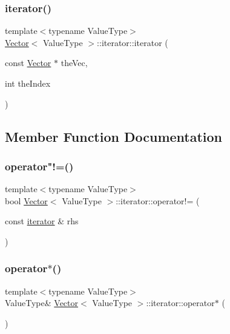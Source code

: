 \subsubsection{\texorpdfstring{iterator()}{iterator()}\hspace{0.1cm}{\footnotesize\ttfamily [3/3]}}
{\footnotesize\ttfamily template$<$typename Value\+Type$>$ \\
\mbox{\hyperlink{classVector}{Vector}}$<$ Value\+Type $>$\+::iterator\+::iterator (\begin{DoxyParamCaption}\item[{const \mbox{\hyperlink{classVector}{Vector}} $\ast$}]{the\+Vec,  }\item[{int}]{the\+Index }\end{DoxyParamCaption})\hspace{0.3cm}{\ttfamily [inline]}}



\subsection{Member Function Documentation}
\mbox{\label{classVector_1_1iterator_a1e7af33b9a9c2d4c9e4ec5ef35603299}} 
\subsubsection{\texorpdfstring{operator"!=()}{operator!=()}}
{\footnotesize\ttfamily template$<$typename Value\+Type$>$ \\
bool \mbox{\hyperlink{classVector}{Vector}}$<$ Value\+Type $>$\+::iterator\+::operator!= (\begin{DoxyParamCaption}\item[{const \mbox{\hyperlink{classVector_1_1iterator}{iterator}} \&}]{rhs }\end{DoxyParamCaption})\hspace{0.3cm}{\ttfamily [inline]}}

\mbox{\label{classVector_1_1iterator_ae8e4de4ccddd2f0611e2fac3945d010d}} 
\subsubsection{\texorpdfstring{operator$\ast$()}{operator*()}}
{\footnotesize\ttfamily template$<$typename Value\+Type$>$ \\
Value\+Type\& \mbox{\hyperlink{classVector}{Vector}}$<$ Value\+Type $>$\+::iterator\+::operator$\ast$ (\begin{DoxyParamCaption}{ }\end{DoxyParamCaption})\hspace{0.3cm}{\ttfamily [inline]}}

